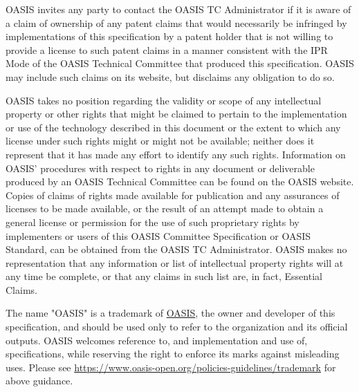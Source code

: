 \begin{titlepage}
OASIS invites any party to contact the OASIS TC Administrator if it is
aware of a claim of ownership of any patent claims that would
necessarily be infringed by implementations of this specification by a
patent holder that is not willing to provide a license to such patent
claims in a manner consistent with the IPR Mode of the OASIS Technical
Committee that produced this specification. OASIS may include such
claims on its website, but disclaims any obligation to do so.

OASIS takes no position regarding the validity or scope of any
intellectual property or other rights that might be claimed to pertain
to the implementation or use of the technology described in this
document or the extent to which any license under such rights might or
might not be available; neither does it represent that it has made any
effort to identify any such rights. Information on OASIS' procedures
with respect to rights in any document or deliverable produced by an
OASIS Technical Committee can be found on the OASIS website. Copies of
claims of rights made available for publication and any assurances of
licenses to be made available, or the result of an attempt made to
obtain a general license or permission for the use of such proprietary
rights by implementers or users of this OASIS Committee Specification
or OASIS Standard, can be obtained from the OASIS TC Administrator.
OASIS makes no representation that any information or list of
intellectual property rights will at any time be complete, or that any
claims in such list are, in fact, Essential Claims.

The name "OASIS" is a trademark of \href{https://www.oasis-open.org/}{OASIS}, the owner and developer of
this specification, and should be used only to refer to the
organization and its official outputs. OASIS welcomes reference to,
and implementation and use of, specifications, while reserving the
right to enforce its marks against misleading uses. Please see
\url{https://www.oasis-open.org/policies-guidelines/trademark} for above guidance.
\\\\

\end{titlepage}
